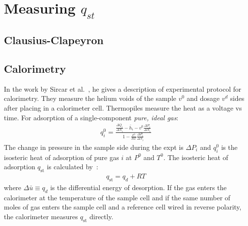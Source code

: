 \documentclass[letterpaper,twocolumn,amsmath,amssymb,jcp,aps,10pt]{revtex4-1}
\begin{document}
\section{Measuring $q_{st}$}
\subsection{Clausius-Clapeyron}
\subsection{Calorimetry} In the work by Sircar et al.~\cite{sircar1999isosteric}, he gives a description of experimental protocol for calorimetry. They measure the helium voids of the sample $v^0$ and dosage $v^d$ sides after placing in a calorimeter cell.  Thermopiles measure the heat as a voltage vs time. For adsorption of a single-component \emph{pure, ideal gas}:
\begin{align}
    q_i^0 = \frac{\frac{\Delta Q_i}{\Delta N_i} - \bar h_i - v^0\frac{\Delta P_i}{\Delta N_i}}{1-\frac{v^0}{RT}\frac{\Delta P_i}{\Delta N_i}}
\end{align}
The change in pressure in the sample side during the expt is $\Delta P_i$ and $q_i^0$ is the isosteric
heat of adsorption of pure gas $i$ at $P^0$ and $T^0$.
The isosteric heat of adsorption $q_\text{st}$ is calculated by~\cite{dunne1996calorimetric, parrillo1993characterization}:
\begin{align}
    q_\text{st} = q_d + RT
\end{align}
where $\Delta \bar u \equiv q_d$ is the differential energy of desorption.  If the gas enters the calorimeter at the temperature of the sample cell and if the same number of
moles of gas enters the sample cell and a reference cell wired in reverse polarity, the calorimeter
measures $q_\text{st}$ directly.

\end{document}
